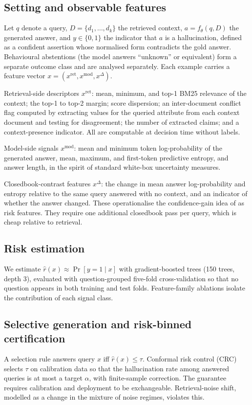 \documentclass[sn-basic]{sn-jnl}
\theoremstyle{thmstyleone}
\theoremstyle{thmstyletwo}
\begin{document}
\subsection{Setting and observable features}
Let $q$ denote a query, $D = \{d_1, \dots, d_k\}$ the retrieved
context, $a = f_\theta(q, D)$ the generated answer, and
$y \in \{0, 1\}$ the indicator that $a$ is a hallucination, defined as
a confident assertion whose normalised form contradicts the gold
answer. Behavioural abstentions (the model answers ``unknown'' or
equivalent) form a separate outcome class and are analysed separately.
Each example carries a feature vector
$x = (x^{\mathrm{ret}}, x^{\mathrm{mod}}, x^{\Delta})$.

Retrieval-side descriptors $x^{\mathrm{ret}}$: mean, minimum, and top-1
BM25 relevance of the context; the top-1 to top-2 margin; score
dispersion; an inter-document conflict flag computed by extracting
values for the queried attribute from each context document and testing
for disagreement; the number of extracted claims; and a
context-presence indicator. All are computable at decision time without
labels.

Model-side signals $x^{\mathrm{mod}}$: mean and minimum token
log-probability of the generated answer, mean, maximum, and first-token
predictive entropy, and answer length, in the spirit of standard
white-box uncertainty measures.

Closedbook-contrast features $x^{\Delta}$: the change in mean answer
log-probability and entropy relative to the same query answered with no
context, and an indicator of whether the answer changed. These
operationalise the confidence-gain idea of \citet{bi2025ckplug} as risk
features. They require one additional closedbook pass per query, which
is cheap relative to retrieval.

\subsection{Risk estimation}
We estimate $\hat r(x) \approx \Pr[y = 1 \mid x]$ with
gradient-boosted trees (150 trees, depth 3), evaluated with
question-grouped five-fold cross-validation so that no question appears
in both training and test folds. Feature-family ablations isolate the
contribution of each signal class.

\subsection{Selective generation and risk-binned certification}
\label{sec:methodconformal}
A selection rule answers query $x$ iff $\hat r(x) \le \tau$. Conformal
risk control (CRC) selects $\tau$ on calibration data so that the
hallucination rate among answered queries is at most a target $\alpha$,
with finite-sample correction. The guarantee requires calibration and
deployment to be exchangeable. Retrieval-noise shift, modelled as a
change in the mixture of noise regimes, violates this.
\end{document}
